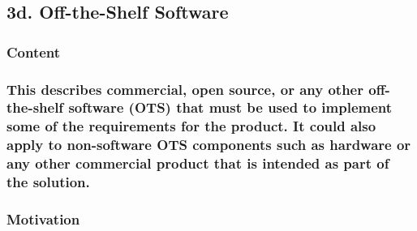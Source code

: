 \documentclass[
]{article}
\begin{document}
\hypertarget{d.-off-the-shelf-software}{%
\subsection{3d. Off-the-Shelf
Software}\label{d.-off-the-shelf-software}}

\hypertarget{content-13}{%
\subsubsection{Content}\label{content-13}}

\hypertarget{this-describes-commercial-open-source-or-any-other-off-the-shelf-software-ots-that-must-be-used-to-implement-some-of-the-requirements-for-the-product.-it-could-also-apply-to-non-software-ots-components-such-as-hardware-or-any-other-commercial-product-that-is-intended-as-part-of-the-solution.}{%
\subsubsection{\texorpdfstring{This describes commercial, open source,
or any other off-the-shelf software (OTS) that must be used to implement
some of the requirements for the product. It could also apply to
non-software OTS components such as hardware or any other commercial
product that is intended as part of the solution.
}{This describes commercial, open source, or any other off-the-shelf software (OTS) that must be used to implement some of the requirements for the product. It could also apply to non-software OTS components such as hardware or any other commercial product that is intended as part of the solution. }}\label{this-describes-commercial-open-source-or-any-other-off-the-shelf-software-ots-that-must-be-used-to-implement-some-of-the-requirements-for-the-product.-it-could-also-apply-to-non-software-ots-components-such-as-hardware-or-any-other-commercial-product-that-is-intended-as-part-of-the-solution.}}

\hypertarget{motivation-13}{%
\subsubsection{Motivation}\label{motivation-13}}
\end{document}
